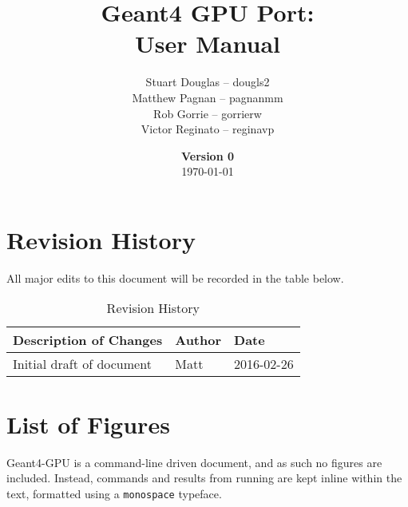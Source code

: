 \documentclass[12pt]{article}
\title{
\LARGE Geant4 GPU Port:
\\\vspace{10mm}
\large \textbf{User Manual}
\vspace{40mm}
}
\author{
Stuart Douglas -- dougls2
\\Matthew Pagnan -- pagnanmm
\\Rob Gorrie -- gorrierw
\\Victor Reginato -- reginavp
\vspace{10mm}
}
\date{\vfill \textbf{Version 0}\\ \today}
\begin{document}

\maketitle
\newpage

\tableofcontents
\newpage
{}
\restoregeometry

\section{Revision History}
All major edits to this document will be recorded in the table below.

\begin{table}[h]
\centering
\caption{Revision History}\label{Table_Revision}
\begin{tabular}{lll}
\toprule
\bf Description of Changes & \bf Author & \bf Date\\\midrule
Initial draft of document & Matt & 2016-02-26\\
\bottomrule
\end{tabular}
\end{table}

\section{List of Figures}
Geant4-GPU is a command-line driven document, and as such no figures are included. Instead, commands and results from running are kept inline within the text, formatted using a \texttt{monospace} typeface.
\end{document}
